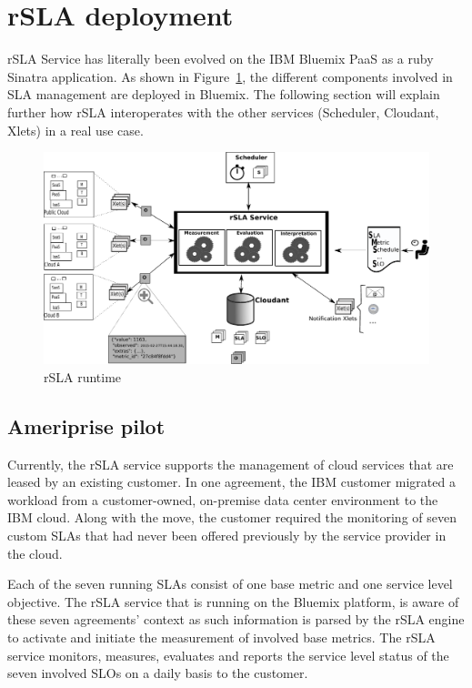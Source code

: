 \section{rSLA deployment }

rSLA Service has literally been evolved on the IBM Bluemix PaaS as a ruby Sinatra application. As shown in Figure~\ref{fig:runtime}, the different components involved in SLA 
management are deployed in Bluemix. The following section will explain further how rSLA interoperates with the other services (Scheduler, Cloudant, Xlets) in a real use case. 

\begin{figure}[H]
\centering
\includegraphics[width=\textwidth]{pics/runtime.pdf}
\caption{\label{fig:runtime} rSLA runtime}
\end{figure}


\subsection{Ameriprise pilot}

Currently, the rSLA service supports the management of cloud services that are leased by an existing customer. In one agreement, the IBM customer migrated a workload from a customer-owned, on-premise data center environment to the IBM cloud.  Along with the move, the customer required the monitoring of seven custom SLAs that had never been offered previously by the service provider in the cloud.

Each of the seven running SLAs consist of one base metric and one service level objective. The rSLA service that is running on the Bluemix platform, is aware of these seven agreements' context as such information is parsed by the rSLA engine to activate and initiate the measurement of involved base metrics. The rSLA service monitors, measures, evaluates and reports the service level status of the seven involved SLOs on a daily basis to the customer. 

